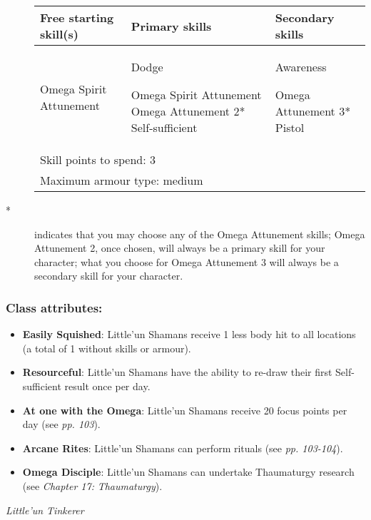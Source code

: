 \begin{description}
\item[]
    \begin{table}[H]
\begin{tabular}{|l|l|l|} \hline 
Free starting skill(s) & Primary skills & Secondary skills \\
 \hline Omega Spirit Attunement & Dodge\par Omega Spirit Attunement Omega Attunement 2* Self-sufficient & Awareness\par Omega Attunement 3* Pistol \\
 \hline \multicolumn{3}{|l|}{Skill points to spend: 3} \\
 \hline \multicolumn{3}{|l|}{Maximum armour type: medium} \\
 \hline \end{tabular}

\end{table}

\item[	*]indicates that you may choose any of the Omega Attunement skills; Omega Attunement 2, once chosen, will always be a primary skill for your character; what you choose for Omega Attunement 3 will always be a secondary skill for your character.

\end{description}

\subsubsection{Class attributes:}

\begin{itemize}
\item \textbf{Easily Squished}: Little'un Shamans receive 1 less body hit to all locations (a total of 1 without skills or armour).

\item \textbf{Resourceful}: Little'un Shamans have the ability to re-draw their first Self-sufficient result once per day.

\item \textbf{At one with the Omega}: Little'un Shamans receive 20 focus points per day (see \textit{pp. 103}).

\item \textbf{Arcane Rites}: Little'un Shamans can perform rituals (see \textit{pp. 103-104}).

\item \textbf{Omega Disciple}: Little'un Shamans can undertake Thaumaturgy research (see \textit{Chapter 17:} \textit{Thaumaturgy}).

\end{itemize}
\textit{Little'un Tinkerer}

